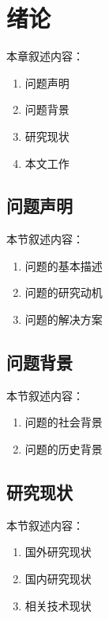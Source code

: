 \chapter{绪\;\;\;论}
\label{chap1}

本章叙述内容：
\begin{enumerate}
  \item 问题声明\cite{liu2003survey}
  \item 问题背景\cite{basdogan2007vr}
  \item 研究现状\cite{preim20083d}
  \item 本文工作\cite{lin1998collision}
\end{enumerate}

\section{问题声明}

本节叙述内容：
\begin{enumerate}
  \item 问题的基本描述\cite{meier2005deformable}
  \item 问题的研究动机\cite{azuma1997survey}
  \item 问题的解决方案
\end{enumerate}

\section{问题背景}

本节叙述内容：
\begin{enumerate}
  \item 问题的社会背景
  \item 问题的历史背景
\end{enumerate}

\section{研究现状}

本节叙述内容：
\begin{enumerate}
  \item 国外研究现状
  \item 国内研究现状
  \item 相关技术现状
\end{enumerate}

